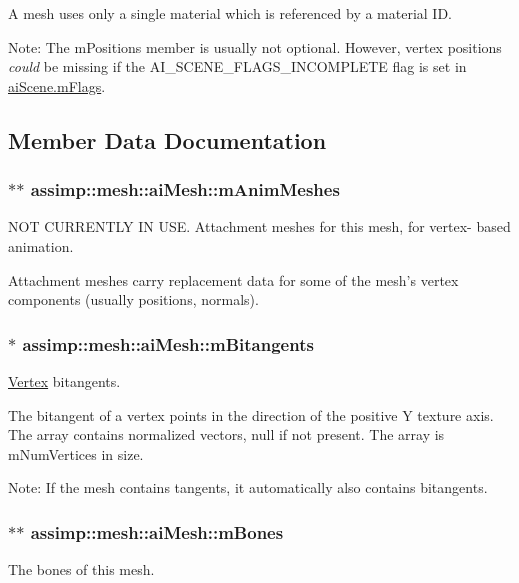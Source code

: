 A mesh uses only a single material which is referenced by a material I\+D.

Note\+: The {\ttfamily m\+Positions} member is usually not optional. However, vertex positions {\itshape could} be missing if the {\ttfamily A\+I\+\_\+\+S\+C\+E\+N\+E\+\_\+\+F\+L\+A\+G\+S\+\_\+\+I\+N\+C\+O\+M\+P\+L\+E\+T\+E} flag is set in {\ttfamily \hyperlink{structai_scene_a4091f10bb81e05db00ebc34f40c48f38}{ai\+Scene.\+m\+Flags}}. 

\subsection{Member Data Documentation}
\hypertarget{structassimp_1_1mesh_1_1ai_mesh_a0ef0cdda627aca52178b73ec25d58a82}{
\subsubsection[{m\+Anim\+Meshes}]{$\ast$$\ast$ assimp\+::mesh\+::ai\+Mesh\+::m\+Anim\+Meshes}}\label{structassimp_1_1mesh_1_1ai_mesh_a0ef0cdda627aca52178b73ec25d58a82}
N\+O\+T C\+U\+R\+R\+E\+N\+T\+L\+Y I\+N U\+S\+E. Attachment meshes for this mesh, for vertex-\/ based animation.

Attachment meshes carry replacement data for some of the mesh's vertex components (usually positions, normals). \hypertarget{structassimp_1_1mesh_1_1ai_mesh_af4383669a527d07e3d40bfc270d0d882}{
\subsubsection[{m\+Bitangents}]{$\ast$ assimp\+::mesh\+::ai\+Mesh\+::m\+Bitangents}}\label{structassimp_1_1mesh_1_1ai_mesh_af4383669a527d07e3d40bfc270d0d882}
\hyperlink{struct_vertex}{Vertex} bitangents.

The bitangent of a vertex points in the direction of the positive Y texture axis. The array contains normalized vectors, null if not present. The array is {\ttfamily m\+Num\+Vertices} in size.

Note\+: If the mesh contains tangents, it automatically also contains bitangents. \hypertarget{structassimp_1_1mesh_1_1ai_mesh_a5148269d290966a3895593009ef619a0}{
\subsubsection[{m\+Bones}]{$\ast$$\ast$ assimp\+::mesh\+::ai\+Mesh\+::m\+Bones}}\label{structassimp_1_1mesh_1_1ai_mesh_a5148269d290966a3895593009ef619a0}
The bones of this mesh.

